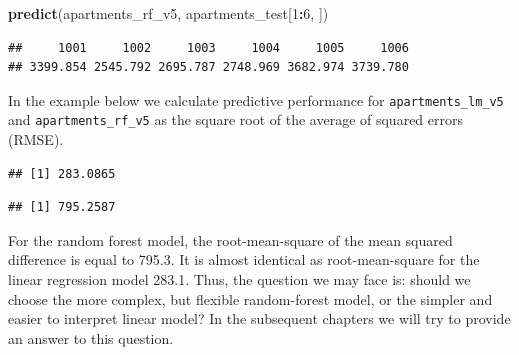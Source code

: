 \documentclass[]{krantz}
\newenvironment{Shaded}{\begin{snugshade}}{\end{snugshade}}
\newcommand{\DecValTok}[1]{\textcolor[rgb]{0.00,0.00,0.81}{#1}}
\newcommand{\KeywordTok}[1]{\textcolor[rgb]{0.13,0.29,0.53}{\textbf{#1}}}
\newcommand{\NormalTok}[1]{#1}
\newcommand{\OperatorTok}[1]{\textcolor[rgb]{0.81,0.36,0.00}{\textbf{#1}}}
\newcommand{\StringTok}[1]{\textcolor[rgb]{0.31,0.60,0.02}{#1}}
\begin{document}
\begin{Shaded}
\begin{Highlighting}[]
\KeywordTok{predict}\NormalTok{(apartments_rf_v5, apartments_test[}\DecValTok{1}\OperatorTok{:}\DecValTok{6}\NormalTok{, ])}
\end{Highlighting}
\end{Shaded}

\begin{verbatim}
##     1001     1002     1003     1004     1005     1006 
## 3399.854 2545.792 2695.787 2748.969 3682.974 3739.780
\end{verbatim}

In the example below we calculate predictive performance for \texttt{apartments\_lm\_v5} and \texttt{apartments\_rf\_v5} as the square root of the average of squared errors (RMSE).

\begin{Shaded}
\end{Shaded}

\begin{verbatim}
## [1] 283.0865
\end{verbatim}

\begin{Shaded}
\end{Shaded}

\begin{verbatim}
## [1] 795.2587
\end{verbatim}

For the random forest model, the root-mean-square of the mean squared difference is equal to 795.3. It is almost identical as root-mean-square for the linear regression model 283.1. Thus, the question we may face is: should we choose the more complex, but flexible random-forest model, or the simpler and easier to interpret linear model? In the subsequent chapters we will try to provide an answer to this question.
\end{document}
